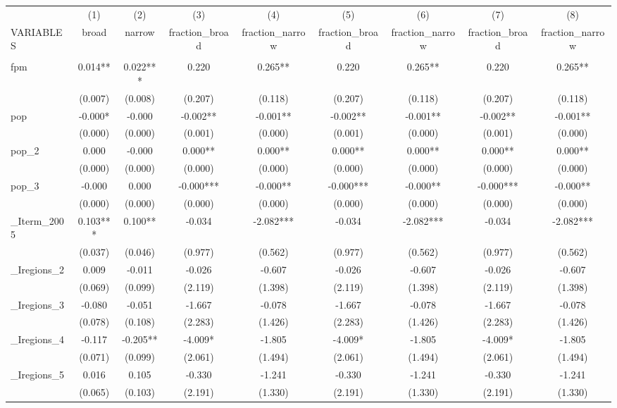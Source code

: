 \documentclass[]{article}
\begin{document}
\begin{tabular}{lcccccccc} \hline
 & (1) & (2) & (3) & (4) & (5) & (6) & (7) & (8) \\
VARIABLES & broad & narrow & fraction\_broad & fraction\_narrow & fraction\_broad & fraction\_narrow & fraction\_broad & fraction\_narrow \\ \hline
 &  &  &  &  &  &  &  &  \\
fpm & 0.014** & 0.022*** & 0.220 & 0.265** & 0.220 & 0.265** & 0.220 & 0.265** \\
 & (0.007) & (0.008) & (0.207) & (0.118) & (0.207) & (0.118) & (0.207) & (0.118) \\
pop & -0.000* & -0.000 & -0.002** & -0.001** & -0.002** & -0.001** & -0.002** & -0.001** \\
 & (0.000) & (0.000) & (0.001) & (0.000) & (0.001) & (0.000) & (0.001) & (0.000) \\
pop\_2 & 0.000 & -0.000 & 0.000** & 0.000** & 0.000** & 0.000** & 0.000** & 0.000** \\
 & (0.000) & (0.000) & (0.000) & (0.000) & (0.000) & (0.000) & (0.000) & (0.000) \\
pop\_3 & -0.000 & 0.000 & -0.000*** & -0.000** & -0.000*** & -0.000** & -0.000*** & -0.000** \\
 & (0.000) & (0.000) & (0.000) & (0.000) & (0.000) & (0.000) & (0.000) & (0.000) \\
\_Iterm\_2005 & 0.103*** & 0.100** & -0.034 & -2.082*** & -0.034 & -2.082*** & -0.034 & -2.082*** \\
 & (0.037) & (0.046) & (0.977) & (0.562) & (0.977) & (0.562) & (0.977) & (0.562) \\
\_Iregions\_2 & 0.009 & -0.011 & -0.026 & -0.607 & -0.026 & -0.607 & -0.026 & -0.607 \\
 & (0.069) & (0.099) & (2.119) & (1.398) & (2.119) & (1.398) & (2.119) & (1.398) \\
\_Iregions\_3 & -0.080 & -0.051 & -1.667 & -0.078 & -1.667 & -0.078 & -1.667 & -0.078 \\
 & (0.078) & (0.108) & (2.283) & (1.426) & (2.283) & (1.426) & (2.283) & (1.426) \\
\_Iregions\_4 & -0.117 & -0.205** & -4.009* & -1.805 & -4.009* & -1.805 & -4.009* & -1.805 \\
 & (0.071) & (0.099) & (2.061) & (1.494) & (2.061) & (1.494) & (2.061) & (1.494) \\
\_Iregions\_5 & 0.016 & 0.105 & -0.330 & -1.241 & -0.330 & -1.241 & -0.330 & -1.241 \\
 & (0.065) & (0.103) & (2.191) & (1.330) & (2.191) & (1.330) & (2.191) & (1.330) \\

\end{tabular}
\end{document}
